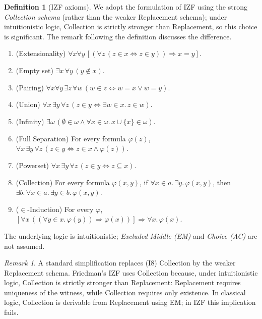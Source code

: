 \documentclass[12pt]{article}
\theoremstyle{definition}
\newtheorem{definition}[theorem]{Definition}
\theoremstyle{remark}
\newtheorem{remark}[theorem]{Remark}
\begin{document}
\begin{definition}[IZF axioms]
\label{def:izf}
We adopt the formulation of IZF using the strong \emph{Collection schema}
(rather than the weaker Replacement schema); under intuitionistic logic, Collection is
strictly stronger than Replacement, so this choice is significant. The remark following
the definition discusses the difference.
\begin{enumerate}
\item[(I1)] (Extensionality) $\forall x\forall y\,[(\forall z\,(z\in x \Leftrightarrow
z\in y))\Rightarrow x=y]$.
\item[(I2)] (Empty set) $\exists x\, \forall y\,(y\notin x)$.
\item[(I3)] (Pairing) $\forall x\forall y\, \exists z\,\forall w\,
(w\in z\Leftrightarrow w=x\vee w=y)$.
\item[(I4)] (Union) $\forall x\, \exists y\,\forall z\,(z\in y \Leftrightarrow \exists w
\in x.\, z\in w)$.
\item[(I5)] (Infinity) $\exists \omega\,(\emptyset\in\omega \wedge \forall x\in\omega.\,
x\cup\{x\}\in\omega)$.
\item[(I6)] (Full Separation) For every formula $\varphi(z)$, $\forall x\,\exists y\,
\forall z\,(z\in y \Leftrightarrow z\in x \wedge \varphi(z))$.
\item[(I7)] (Powerset) $\forall x\, \exists y\, \forall z\,(z\in y \Leftrightarrow z
\subseteq x)$.
\item[(I8)] (Collection) For every formula $\varphi(x,y)$, if $\forall x\in a.\,\exists
y.\, \varphi(x,y)$, then $\exists b.\,\forall x\in a.\,\exists y\in b.\, \varphi(x,y)$.
\item[(I9)] ($\in$-Induction) For every $\varphi$,
$[\forall x\,((\forall y\in x.\,\varphi(y))\Rightarrow \varphi(x))]\Rightarrow \forall x.\,
\varphi(x)$.
\end{enumerate}
The underlying logic is intuitionistic; \emph{Excluded Middle (EM)} and \emph{Choice (AC)}
are not assumed.
\end{definition}

\begin{remark}
A standard simplification replaces (I8) Collection by the weaker Replacement schema.
Friedman's IZF uses Collection because, under intuitionistic logic, Collection is
strictly stronger than Replacement: Replacement requires uniqueness of the witness, while
Collection requires only existence. In classical logic, Collection is derivable from
Replacement using EM; in IZF this implication fails.
\end{remark}
\end{document}
